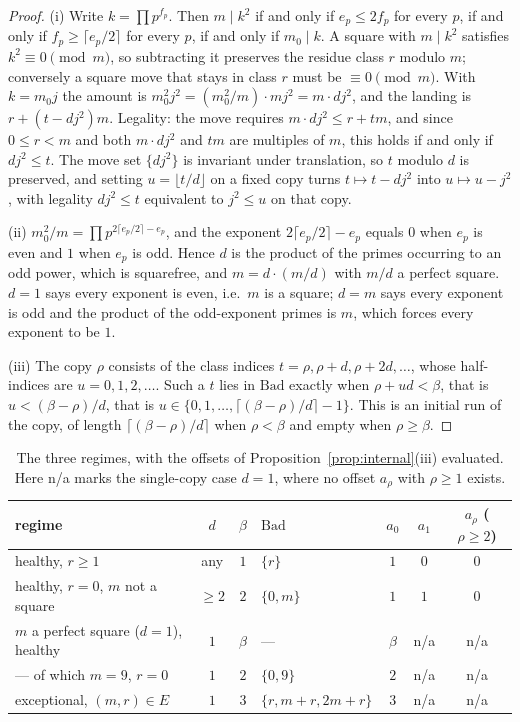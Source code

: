 \begin{proof}
(i) Write $k = \prod p^{f_p}$. Then $m \mid k^2$ if and only if
$e_p \le 2 f_p$ for every $p$, if and only if
$f_p \ge \lceil e_p/2 \rceil$ for every $p$, if and only if
$m_0 \mid k$. A square with $m \mid k^2$ satisfies
$k^2 \equiv 0 \pmod m$, so subtracting it preserves the residue class $r$
modulo $m$; conversely a square move that stays in class $r$ must be
$\equiv 0 \pmod m$. With $k = m_0 j$ the amount is
$m_0^2 j^2 = (m_0^2/m) \cdot m j^2 = m \cdot d j^2$, and the landing is
$r + (t - d j^2)m$. Legality: the move requires
$m \cdot d j^2 \le r + tm$, and since $0 \le r < m$ and both
$m \cdot d j^2$ and $tm$ are multiples of $m$, this holds if and only if
$d j^2 \le t$. The move set $\{d j^2\}$ is invariant under translation,
so $t$ modulo $d$ is preserved, and setting $u = \lfloor t/d \rfloor$ on
a fixed copy turns $t \mapsto t - d j^2$ into $u \mapsto u - j^2$, with
legality $d j^2 \le t$ equivalent to $j^2 \le u$ on that copy.

(ii) $m_0^2/m = \prod p^{2 \lceil e_p/2 \rceil - e_p}$, and the exponent
$2 \lceil e_p/2 \rceil - e_p$ equals $0$ when $e_p$ is even and $1$ when
$e_p$ is odd. Hence $d$ is the product of the primes occurring to an odd
power, which is squarefree, and $m = d \cdot (m/d)$ with $m/d$ a perfect
square. $d = 1$ says every exponent is even, i.e.\ $m$ is a square;
$d = m$ says every exponent is odd and the product of the odd-exponent
primes is $m$, which forces every exponent to be $1$.

(iii) The copy $\rho$ consists of the class indices
$t = \rho, \rho + d, \rho + 2d, \dots$, whose half-indices are
$u = 0, 1, 2, \dots$. Such a $t$ lies in $\mathrm{Bad}$ exactly when
$\rho + ud < \beta$, that is $u < (\beta - \rho)/d$, that is
$u \in \{0, 1, \dots, \lceil (\beta - \rho)/d \rceil - 1\}$. This is an
initial run of the copy, of length $\lceil (\beta - \rho)/d \rceil$ when
$\rho < \beta$ and empty when $\rho \ge \beta$.
\end{proof}

\begin{table}[htbp]
\centering
\begin{tabular}{l c c l c c c}
\hline
regime & $d$ & $\beta$ & $\mathrm{Bad}$ & $a_0$ & $a_1$ & $a_\rho$ ($\rho \ge 2$) \\
\hline
healthy, $r \ge 1$ & any & $1$ & $\{r\}$ & $1$ & $0$ & $0$ \\
healthy, $r = 0$, $m$ not a square & $\ge 2$ & $2$ & $\{0, m\}$ & $1$ & $1$ & $0$ \\
$m$ a perfect square ($d = 1$), healthy & $1$ & $\beta$ & --- & $\beta$ & n/a & n/a \\
--- of which $m = 9$, $r = 0$ & $1$ & $2$ & $\{0, 9\}$ & $2$ & n/a & n/a \\
exceptional, $(m,r) \in E$ & $1$ & $3$ & $\{r, m+r, 2m+r\}$ & $3$ & n/a & n/a \\
\hline
\end{tabular}
\caption{The three regimes, with the offsets of
Proposition~\ref{prop:internal}(iii) evaluated. Here n/a marks the
single-copy case $d = 1$, where no offset $a_\rho$ with $\rho \ge 1$
exists.}
\label{tab:regimes}
\end{table}

